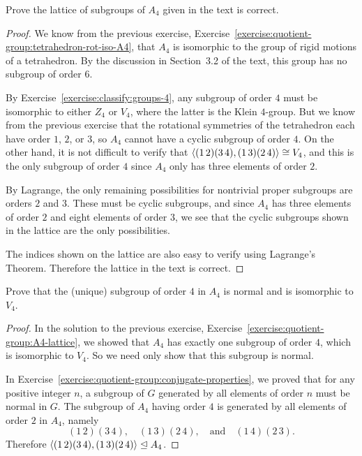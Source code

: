 \label{exercise:quotient-group:A4-lattice}
Prove the lattice of subgroups of $A_4$ given in the text is correct.
\begin{proof}
  We know from the previous exercise,
  Exercise~\ref{exercise:quotient-group:tetrahedron-rot-iso-A4}, that
  $A_4$ is isomorphic to the group of rigid motions of a
  tetrahedron. By the discussion in Section~3.2 of the text, this
  group has no subgroup of order $6$.

  By Exercise~\ref{exercise:classify:groups-4}, any subgroup of order
  $4$ must be isomorphic to either $Z_4$ or $V_4$, where the latter is
  the Klein $4$-group. But we know from the previous exercise that the
  rotational symmetries of the tetrahedron each have order $1$, $2$,
  or $3$, so $A_4$ cannot have a cyclic subgroup of order $4$. On the
  other hand, it is not difficult to verify that
  $\langle{(1\,2)(3\,4), (1\,3)(2\,4)}\rangle\cong V_4$, and this is the only
  subgroup of order $4$ since $A_4$ only has three elements of order
  $2$.

  By Lagrange, the only remaining possibilities for nontrivial proper
  subgroups are orders $2$ and $3$. These must be cyclic subgroups,
  and since $A_4$ has three elements of order $2$ and eight elements
  of order $3$, we see that the cyclic subgroups shown in the lattice
  are the only possibilities.

  The indices shown on the lattice are also easy to verify using
  Lagrange's Theorem. Therefore the lattice in the text is correct.
\end{proof}

 Prove that the (unique) subgroup of order $4$ in $A_4$ is
normal and is isomorphic to $V_4$.
\begin{proof}
  In the solution to the previous exercise,
  Exercise~\ref{exercise:quotient-group:A4-lattice}, we showed that
  $A_4$ has exactly one subgroup of order $4$, which is isomorphic to
  $V_4$. So we need only show that this subgroup is normal.

  In Exercise~\ref{exercise:quotient-group:conjugate-properties}, we
  proved that for any positive integer $n$, a subgroup of $G$
  generated by all elements of order $n$ must be normal in $G$. The
  subgroup of $A_4$ having order $4$ is generated by all elements of
  order $2$ in $A_4$, namely
  \begin{equation*}
    (1\,2)(3\,4), \quad
    (1\,3)(2\,4), \quad\text{and}\quad
    (1\,4)(2\,3).
  \end{equation*}
  Therefore $\langle{(1\,2)(3\,4), (1\,3)(2\,4)}\rangle\trianglelefteq A_4$.
\end{proof}
